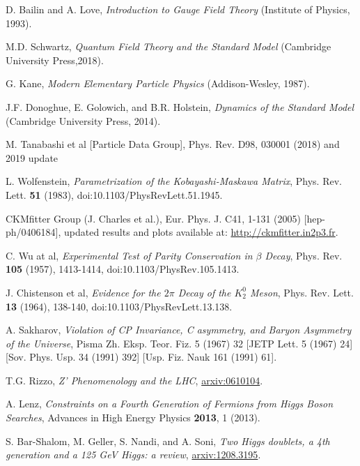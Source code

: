 \documentclass[a4paper,12pt]{article}
\begin{document}
\begin{thebibliography}{99}

D. Bailin and A. Love, \emph{Introduction to Gauge Field Theory} (Institute of Physics, 1993).

M.D. Schwartz, \emph{Quantum Field Theory and the Standard Model} (Cambridge University Press,2018).

G. Kane, \emph{Modern Elementary Particle Physics} (Addison-Wesley, 1987).

J.F. Donoghue, E. Golowich, and B.R. Holstein, \emph{Dynamics of the Standard Model} (Cambridge University Press, 2014).

M. Tanabashi et al [Particle Data Group], Phys. Rev. D98, 030001 (2018) and 2019 update

L. Wolfenstein, \emph{Parametrization of the Kobayashi-Maskawa Matrix}, Phys. Rev. Lett. \textbf{51} (1983), doi:10.1103/PhysRevLett.51.1945.

CKMfitter Group (J. Charles et al.), Eur. Phys. J. C41, 1-131 (2005) [hep-ph/0406184], updated results and plots available at: \href{http://ckmfitter.in2p3.fr}{http://ckmfitter.in2p3.fr}.

C. Wu at al, \emph{Experimental Test of Parity Conservation in $\beta$ Decay}, Phys. Rev. \textbf{105} (1957), 1413-1414, doi:10.1103/PhysRev.105.1413.

J. Chistenson et al, \emph{Evidence for the $2\pi$ Decay of the $K_2^0$ Meson}, Phys. Rev. Lett. \textbf{13} (1964), 138-140, doi:10.1103/PhysRevLett.13.138.

A. Sakharov, \emph{Violation of CP Invariance, C asymmetry, and Baryon Asymmetry of the Universe}, Pisma Zh. Eksp. Teor. Fiz. 5 (1967) 32 [JETP Lett. 5 (1967) 24] [Sov. Phys. Usp. 34 (1991) 392] [Usp. Fiz. Nauk 161 (1991) 61].

T.G. Rizzo, \emph{Z' Phenomenology and the LHC}, \href{https://arxiv.org/pdf/hep-ph/0610104.pdf}{arxiv:0610104}.

A. Lenz, \emph{Constraints on a Fourth Generation of Fermions from Higgs Boson Searches}, Advances in High Energy Physics \textbf{2013}, 1 (2013).

S. Bar-Shalom, M. Geller, S. Nandi, and A. Soni, \emph{Two Higgs doublets, a 4th generation and a 125 GeV Higgs: a review}, \href{https://arxiv.org/pdf/1208.3195v2.pdf}{arxiv:1208.3195}.


\end{thebibliography}
\end{document}
